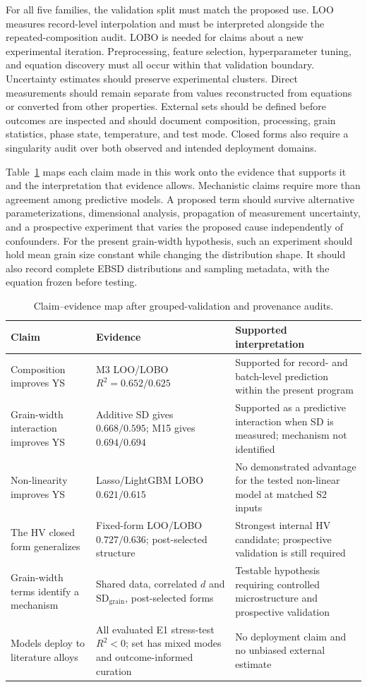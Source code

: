 \documentclass[5p,times,twocolumn]{elsarticle}
\begin{document}
For all five families, the validation split must match the proposed use. LOO measures record-level interpolation and must be interpreted alongside the repeated-composition audit. LOBO is needed for claims about a new experimental iteration. Preprocessing, feature selection, hyperparameter tuning, and equation discovery must all occur within that validation boundary. Uncertainty estimates should preserve experimental clusters. Direct measurements should remain separate from values reconstructed from equations or converted from other properties. External sets should be defined before outcomes are inspected and should document composition, processing, grain statistics, phase state, temperature, and test mode. Closed forms also require a singularity audit over both observed and intended deployment domains.

Table~\ref{tab:evidence} maps each claim made in this work onto the evidence that supports it and the interpretation that evidence allows. Mechanistic claims require more than agreement among predictive models. A proposed term should survive alternative parameterizations, dimensional analysis, propagation of measurement uncertainty, and a prospective experiment that varies the proposed cause independently of confounders. For the present grain-width hypothesis, such an experiment should hold mean grain size constant while changing the distribution shape. It should also record complete EBSD distributions and sampling metadata, with the equation frozen before testing.

\begin{table}[t]
\centering
\caption{Claim--evidence map after grouped-validation and provenance audits.}
\label{tab:evidence}
\small
\begin{tabularx}{\textwidth}{@{}p{3.4cm}p{5.4cm}X@{}}
\toprule
Claim & Evidence & Supported interpretation \\
\midrule
Composition improves YS & M3 LOO/LOBO $R^2=0.652/0.625$ & Supported for record- and batch-level prediction within the present program \\
Grain-width interaction improves YS & Additive SD gives $0.668/0.595$; M15 gives $0.694/0.694$ & Supported as a predictive interaction when SD is measured; mechanism not identified \\
Non-linearity improves YS & Lasso/LightGBM LOBO $0.621/0.615$ & No demonstrated advantage for the tested non-linear model at matched S2 inputs \\
The HV closed form generalizes & Fixed-form LOO/LOBO $0.727/0.636$; post-selected structure & Strongest internal HV candidate; prospective validation is still required \\
Grain-width terms identify a mechanism & Shared data, correlated $d$ and $\mathrm{SD}_{\mathrm{grain}}$, post-selected forms & Testable hypothesis requiring controlled microstructure and prospective validation \\
Models deploy to literature alloys & All evaluated E1 stress-test $R^2<0$; set has mixed modes and outcome-informed curation & No deployment claim and no unbiased external estimate \\
\bottomrule
\end{tabularx}
\end{table}
\end{document}
